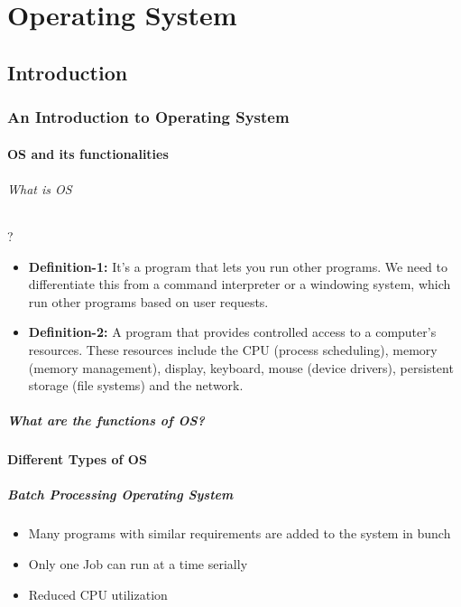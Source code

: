 \part{Operating System}

\chapter{Introduction}
\section{An Introduction to Operating System}
\subsection{OS and its functionalities}
\paragraph{What is OS}?
\begin{itemize}
	\item \textbf{Definition-1:} It's a program that lets you run other programs. We need to differentiate this from a command interpreter or a windowing system, which run other programs based on user requests.
	\item \textbf{Definition-2:} A program that provides controlled access to a computer's resources. These resources include the CPU (process scheduling), memory (memory management), display, keyboard, mouse (device drivers), persistent storage (file systems) and the network.
\end{itemize}
\subsubsection{What are the functions of OS?}
\subsection{Different Types of OS}
\subsubsection{Batch Processing Operating System} 
\begin{itemize}
	\item Many programs with similar requirements are added to the system in bunch
	\item Only one Job can run at a time serially
	\item Reduced CPU utilization
\end{itemize}


